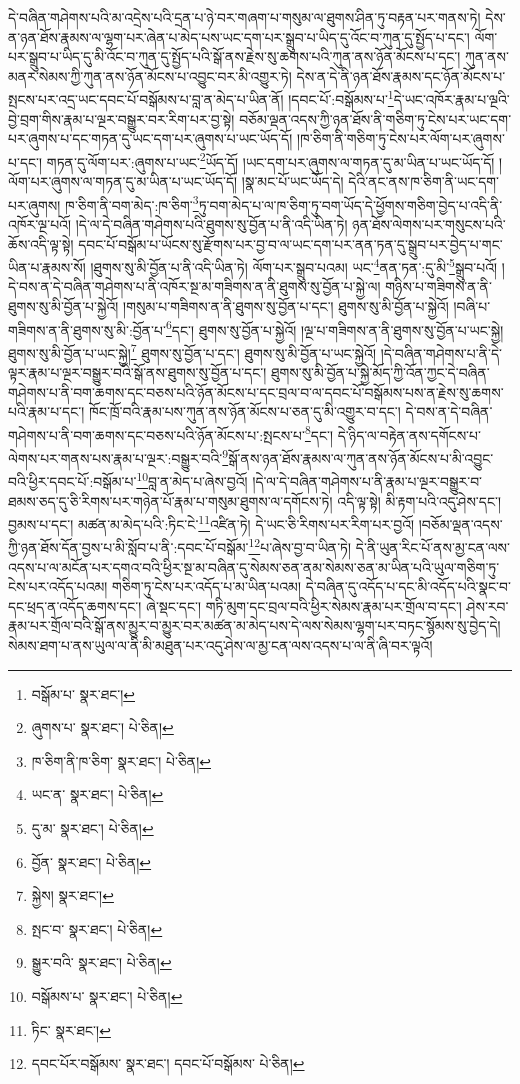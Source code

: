 དེ་བཞིན་གཤེགས་པའི་མ་འདྲེས་པའི་དྲན་པ་ཉེ་བར་གཞག་པ་གསུམ་ལ་ཐུགས་ཤིན་ཏུ་བརྟན་པར་གནས་ཏེ། དེས་ན་ཉན་ཐོས་རྣམས་ལ་ལྷག་པར་ཞེན་པ་མེད་པས་ཡང་དག་པར་སྒྲུབ་པ་ཡིད་དུ་འོང་བ་ཀུན་དུ་སྤྱོད་པ་དང་། ལོག་པར་སྒྲུབ་པ་ཡིད་དུ་མི་འོང་བ་ཀུན་དུ་སྤྱོད་པའི་སྒོ་ནས་རྗེས་སུ་ཆགས་པའི་ཀུན་ནས་ཉོན་མོངས་པ་དང་། ཀུན་ནས་མནར་སེམས་ཀྱི་ཀུན་ནས་ཉོན་མོངས་པ་འབྱུང་བར་མི་འགྱུར་ཏེ། དེས་ན་དེ་ནི་ཉན་ཐོས་རྣམས་དང་ཉོན་མོངས་པ་སྤངས་པར་འདྲ་ཡང་དབང་པོ་བསྒོམས་པ་བླ་ན་མེད་པ་ཡིན་ནོ། །དབང་པོ་:བསྒོམས་པ་\footnote{བསྒོམ་པ་  སྣར་ཐང་། }དེ་ཡང་འཁོར་རྣམ་པ་ལྔའི་བྱེ་བྲག་གིས་རྣམ་པ་ལྔར་བསྒྱུར་བར་རིག་པར་བྱ་སྟེ། བཅོམ་ལྡན་འདས་ཀྱི་ཉན་ཐོས་ནི་གཅིག་ཏུ་ངེས་པར་ཡང་དག་པར་ཞུགས་པ་དང་གཏན་དུ་ཡང་དག་པར་ཞུགས་པ་ཡང་ཡོད་དོ། །ཁ་ཅིག་ནི་གཅིག་ཏུ་ངེས་པར་ལོག་པར་ཞུགས་པ་དང་། གཏན་དུ་ལོག་པར་:ཞུགས་པ་ཡང་\footnote{ཞུགས་པ་  སྣར་ཐང་།  པེ་ཅིན། }ཡོད་དོ། །ཡང་དག་པར་ཞུགས་ལ་གཏན་དུ་མ་ཡིན་པ་ཡང་ཡོད་དོ། །ལོག་པར་ཞུགས་ལ་གཏན་དུ་མ་ཡིན་པ་ཡང་ཡོད་དོ། །སྣ་མང་པོ་ཡང་ཡོད་དེ། དེའི་ནང་ནས་ཁ་ཅིག་ནི་ཡང་དག་པར་ཞུགས། ཁ་ཅིག་ནི་བག་མེད་:ཁ་ཅིག་\footnote{ཁ་ཅིག་ནི་ཁ་ཅིག་  སྣར་ཐང་།  པེ་ཅིན། }ཏུ་བག་མེད་པ་ལ་ཁ་ཅིག་ཏུ་བག་ཡོད་དེ་ཕྱོགས་གཅིག་བྱེད་པ་འདི་ནི་འཁོར་ལྔ་པའོ། །དེ་ལ་དེ་བཞིན་གཤེགས་པའི་ཐུགས་སུ་བྱོན་པ་ནི་འདི་ཡིན་ཏེ། ཉན་ཐོས་ལེགས་པར་གསུངས་པའི་ཆོས་འདི་ལྟ་སྟེ། དབང་པོ་བསྒོམ་པ་ཡོངས་སུ་རྫོགས་པར་བྱ་བ་ལ་ཡང་དག་པར་ནན་ཏན་དུ་སྒྲུབ་པར་བྱེད་པ་གང་ཡིན་པ་རྣམས་སོ། །ཐུགས་སུ་མི་བྱོན་པ་ནི་འདི་ཡིན་ཏེ། ལོག་པར་སྒྲུབ་པའམ། ཡང་\footnote{ཡང་ན་  སྣར་ཐང་།  པེ་ཅིན། }ནན་ཏན་:དུ་མི་\footnote{དུ་མ་  སྣར་ཐང་།  པེ་ཅིན། }སྒྲུབ་པའོ། །དེ་བས་ན་དེ་བཞིན་གཤེགས་པ་ནི་འཁོར་སྔ་མ་གཟིགས་ན་ནི་ཐུགས་སུ་བྱོན་པ་སྐྱེ་ལ། གཉིས་པ་གཟིགས་ན་ནི་ཐུགས་སུ་མི་བྱོན་པ་སྐྱེའོ། །གསུམ་པ་གཟིགས་ན་ནི་ཐུགས་སུ་བྱོན་པ་དང་། ཐུགས་སུ་མི་བྱོན་པ་སྐྱེའོ། །བཞི་པ་གཟིགས་ན་ནི་ཐུགས་སུ་མི་:བྱོན་པ་\footnote{བྱོན་  སྣར་ཐང་།  པེ་ཅིན། }དང་། ཐུགས་སུ་བྱོན་པ་སྐྱེའོ། །ལྔ་པ་གཟིགས་ན་ནི་ཐུགས་སུ་བྱོན་པ་ཡང་སྐྱེ། ཐུགས་སུ་མི་བྱོན་པ་ཡང་སྐྱེ།\footnote{སྐྱེས།  སྣར་ཐང་། } ཐུགས་སུ་བྱོན་པ་དང་། ཐུགས་སུ་མི་བྱོན་པ་ཡང་སྐྱེའོ། །དེ་བཞིན་གཤེགས་པ་ནི་དེ་ལྟར་རྣམ་པ་ལྔར་བསྒྱུར་བའི་སྒོ་ནས་ཐུགས་སུ་བྱོན་པ་དང་། ཐུགས་སུ་མི་བྱོན་པ་སྐྱེ་མོད་ཀྱི་འོན་ཀྱང་དེ་བཞིན་གཤེགས་པ་ནི་བག་ཆགས་དང་བཅས་པའི་ཉོན་མོངས་པ་དང་བྲལ་བ་ལ་དབང་པོ་བསྒོམས་པས་ན་རྗེས་སུ་ཆགས་པའི་རྣམ་པ་དང་། ཁོང་ཁྲོ་བའི་རྣམ་པས་ཀུན་ནས་ཉོན་མོངས་པ་ཅན་དུ་མི་འགྱུར་བ་དང་། དེ་བས་ན་དེ་བཞིན་གཤེགས་པ་ནི་བག་ཆགས་དང་བཅས་པའི་ཉོན་མོངས་པ་:སྤངས་པ་\footnote{སྤང་བ་  སྣར་ཐང་།  པེ་ཅིན། }དང་། དེ་ཉིད་ལ་བརྟེན་ནས་དགོངས་པ་ལེགས་པར་གནས་པས་རྣམ་པ་ལྔར་:བསྒྱུར་བའི་\footnote{སྒྱུར་བའི་  སྣར་ཐང་།  པེ་ཅིན། }སྒོ་ནས་ཉན་ཐོས་རྣམས་ལ་ཀུན་ནས་ཉོན་མོངས་པ་མི་འབྱུང་བའི་ཕྱིར་དབང་པོ་:བསྒོམ་པ་\footnote{བསྒོམས་པ་  སྣར་ཐང་།  པེ་ཅིན། }བླ་ན་མེད་པ་ཞེས་བྱའོ། །དེ་ལ་དེ་བཞིན་གཤེགས་པ་ནི་རྣམ་པ་ལྔར་བསྒྱུར་བ་ཐམས་ཅད་དུ་ཅི་རིགས་པར་གཉེན་པོ་རྣམ་པ་གསུམ་ཐུགས་ལ་དགོངས་ཏེ། འདི་ལྟ་སྟེ། མི་རྟག་པའི་འདུ་ཤེས་དང་། བྱམས་པ་དང་། མཚན་མ་མེད་པའི་:ཏིང་ངེ་\footnote{ཏིང་  སྣར་ཐང་། }འཛིན་ཏེ། དེ་ཡང་ཅི་རིགས་པར་རིག་པར་བྱའོ། །བཅོམ་ལྡན་འདས་ཀྱི་ཉན་ཐོས་དོན་བྱས་པ་མི་སློབ་པ་ནི་:དབང་པོ་བསྒོམ་\footnote{དབང་པོར་བསྒོམས་  སྣར་ཐང་། དབང་པོ་བསྒོམས་  པེ་ཅིན། }པ་ཞེས་བྱ་བ་ཡིན་ཏེ། དེ་ནི་ཡུན་རིང་པོ་ནས་མྱ་ངན་ལས་འདས་པ་ལ་མངོན་པར་དགའ་བའི་ཕྱིར་སྔ་མ་བཞིན་དུ་སེམས་ཅན་ནམ་སེམས་ཅན་མ་ཡིན་པའི་ཡུལ་གཅིག་ཏུ་ངེས་པར་འདོད་པའམ། གཅིག་ཏུ་ངེས་པར་འདོད་པ་མ་ཡིན་པའམ། དེ་བཞིན་དུ་འདོད་པ་དང་མི་འདོད་པའི་སྣང་བ་དང་ཕྲད་ན་འདོད་ཆགས་དང་། ཞེ་སྡང་དང་། གཏི་མུག་དང་བྲལ་བའི་ཕྱིར་སེམས་རྣམ་པར་གྲོལ་བ་དང་། ཤེས་རབ་རྣམ་པར་གྲོལ་བའི་སྒོ་ནས་མྱུར་བ་མྱུར་བར་མཚན་མ་མེད་པས་དེ་ལས་སེམས་ལྷག་པར་བཏང་སྙོམས་སུ་བྱེད་དེ། སེམས་ཐག་པ་ནས་ཡུལ་ལ་ནི་མི་མཐུན་པར་འདུ་ཤེས་ལ་མྱ་ངན་ལས་འདས་པ་ལ་ནི་ཞི་བར་ལྟའོ། 